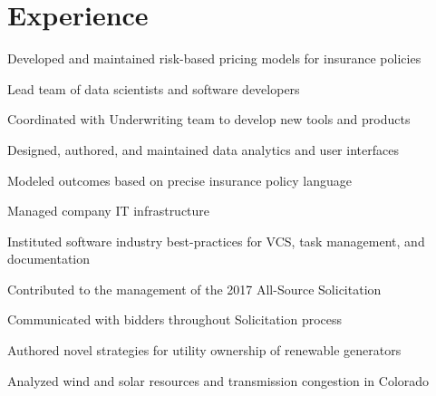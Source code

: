 \documentclass[]{deedy-resume-openfont}
\begin{document}
\begin{minipage}[t]{0.66\textwidth} 


\section{Experience}

	\vspace{\topsep}
	\begin{tightemize}
	\item Developed and maintained risk-based pricing models for insurance policies
	\item Lead team of data scientists and software developers  %
	\item Coordinated with Underwriting team to develop new tools and products
	\item Designed, authored, and maintained data analytics and user interfaces
	\item Modeled outcomes based on precise insurance policy language
	\item Managed company IT infrastructure
	\item Instituted software industry best-practices for VCS, task management, and documentation 
	\end{tightemize}
	\sectionsep

\begin{tightemize}
\item Contributed to the management of the 2017 All-Source Solicitation
\item Communicated with bidders throughout Solicitation process
\item Authored novel strategies for utility ownership of renewable generators
\item Analyzed wind and solar resources and transmission congestion in Colorado
\end{tightemize}
\sectionsep


\end{minipage}
\end{document}
